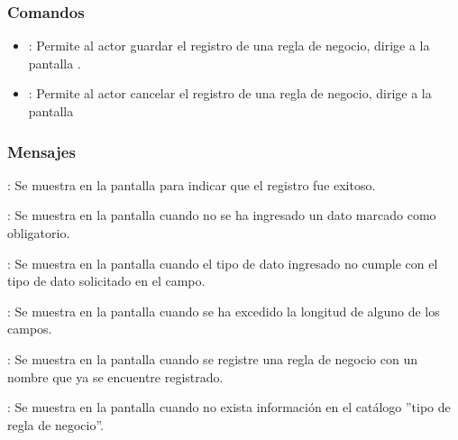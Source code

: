 \subsubsection{Comandos}
\begin{itemize}
	\item {}: Permite al actor guardar el registro de una regla de negocio, dirige a la pantalla .
	\item {}: Permite al actor cancelar el registro de una regla de negocio, dirige a la pantalla 
\end{itemize}

\subsubsection{Mensajes}

\begin{Citemize}
	\item {}: Se muestra en la pantalla  para indicar que el registro fue exitoso.
	\item {}: Se muestra en la pantalla  cuando no se ha ingresado un dato marcado como obligatorio.
	\item {}: Se muestra en la pantalla  cuando el tipo de dato ingresado no cumple con el tipo de dato solicitado en el campo.
	\item {}: Se muestra en la pantalla  cuando se ha excedido la longitud de alguno de los campos.
	\item {}: Se muestra en la pantalla  cuando se registre una regla de negocio con un nombre que ya se encuentre registrado.
	\item {}: Se muestra en la pantalla  cuando no exista información en el catálogo ''tipo de regla de negocio''.
\end{Citemize}
